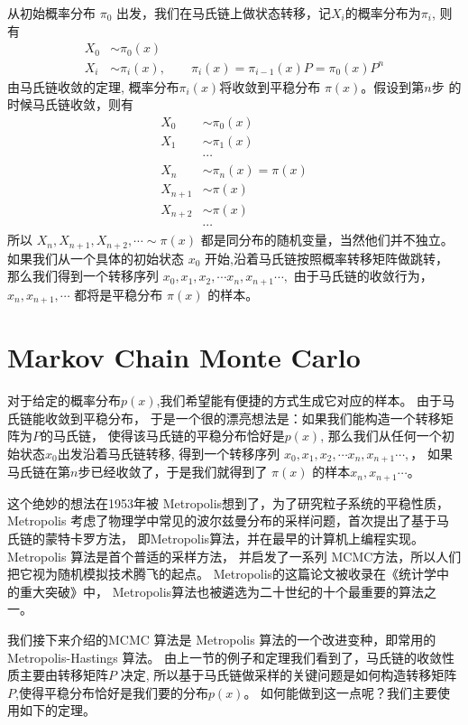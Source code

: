 从初始概率分布 $\pi_0$ 出发，我们在马氏链上做状态转移，记$X_i$的概率分布为$\pi_i$, 则有
\begin{align*}
X_0 & \sim \pi_0(x) \\
X_i & \sim \pi_i(x),  \quad\quad \pi_i(x) = \pi_{i-1}(x)P = \pi_0(x)P^n
\end{align*}
由马氏链收敛的定理, 概率分布$\pi_i(x)$将收敛到平稳分布 $\pi(x)$。假设到第$n$步
的时候马氏链收敛，则有
\begin{align*}
X_0 & \sim \pi_0(x) \\
X_1 & \sim \pi_1(x) \\
& \cdots \\
X_n & \sim \pi_n(x)=\pi(x) \\
X_{n+1} & \sim \pi(x) \\
X_{n+2}& \sim \pi(x) \\
& \cdots
\end{align*}
所以 $X_n,X_{n+1},X_{n+2},\cdots \sim \pi(x)$ 都是同分布的随机变量，当然他们并不独立。
如果我们从一个具体的初始状态 $x_0$ 开始,沿着马氏链按照概率转移矩阵做跳转，
那么我们得到一个转移序列 $x_0, x_1, x_2, \cdots x_n, x_{n+1}\cdots,$
由于马氏链的收敛行为， $x_n, x_{n+1},\cdots$ 都将是平稳分布 $\pi(x)$ 的样本。

\section{Markov Chain Monte Carlo}
对于给定的概率分布$p(x)$,我们希望能有便捷的方式生成它对应的样本。
由于马氏链能收敛到平稳分布， 于是一个很的漂亮想法是：如果我们能构造一个转移矩阵为$P$的马氏链，
使得该马氏链的平稳分布恰好是$p(x)$,
那么我们从任何一个初始状态$x_0$出发沿着马氏链转移, 得到一个转移序列
$x_0, x_1, x_2, \cdots x_n, x_{n+1}\cdots,$， 如果马氏链在第$n$步已经收敛了，于是我们就得到了
$\pi(x)$ 的样本$x_n, x_{n+1}\cdots$。

这个绝妙的想法在1953年被 Metropolis想到了，为了研究粒子系统的平稳性质，
Metropolis 考虑了物理学中常见的波尔兹曼分布的采样问题，首次提出了基于马氏链的蒙特卡罗方法，
即Metropolis算法，并在最早的计算机上编程实现。Metropolis 算法是首个普适的采样方法，
并启发了一系列 MCMC方法，所以人们把它视为随机模拟技术腾飞的起点。
Metropolis的这篇论文被收录在《统计学中的重大突破》中，
Metropolis算法也被遴选为二十世纪的十个最重要的算法之一。

我们接下来介绍的MCMC 算法是 Metropolis 算法的一个改进变种，即常用的 Metropolis-Hastings 算法。
由上一节的例子和定理我们看到了，马氏链的收敛性质主要由转移矩阵$P$ 决定,
所以基于马氏链做采样的关键问题是如何构造转移矩阵$P$,使得平稳分布恰好是我们要的分布$p(x)$。
如何能做到这一点呢？我们主要使用如下的定理。

